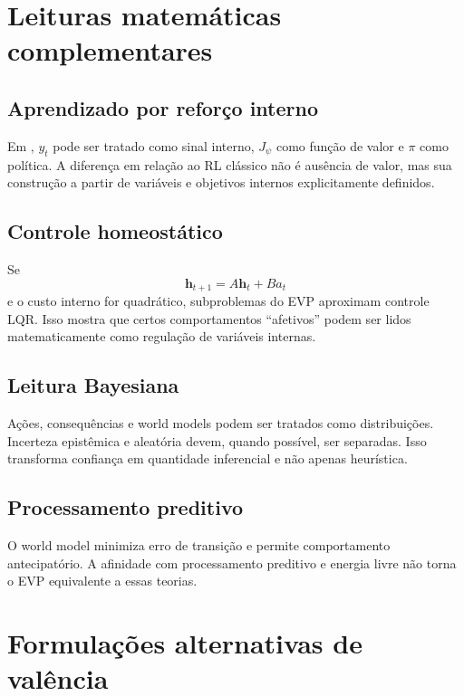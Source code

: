 \section{Leituras matemáticas complementares}

\subsection{Aprendizado por reforço interno}

Em \EVPM, \(y_t\) pode ser tratado como sinal interno, \(J_\psi\) como função de valor e \(\pi\) como política. A diferença em relação ao RL clássico não é ausência de valor, mas sua construção a partir de variáveis e objetivos internos explicitamente definidos.

\subsection{Controle homeostático}

Se
\[
\mathbf h_{t+1}=A\mathbf h_t+Ba_t
\]
e o custo interno for quadrático, subproblemas do EVP aproximam controle LQR. Isso mostra que certos comportamentos ``afetivos'' podem ser lidos matematicamente como regulação de variáveis internas.

\subsection{Leitura Bayesiana}

Ações, consequências e world models podem ser tratados como distribuições. Incerteza epistêmica e aleatória devem, quando possível, ser separadas. Isso transforma confiança em quantidade inferencial e não apenas heurística.

\subsection{Processamento preditivo}

O world model minimiza erro de transição e permite comportamento antecipatório. A afinidade com processamento preditivo \parencite{clark2016} e energia livre \parencite{friston2010} não torna o EVP equivalente a essas teorias.

\section{Formulações alternativas de valência}

